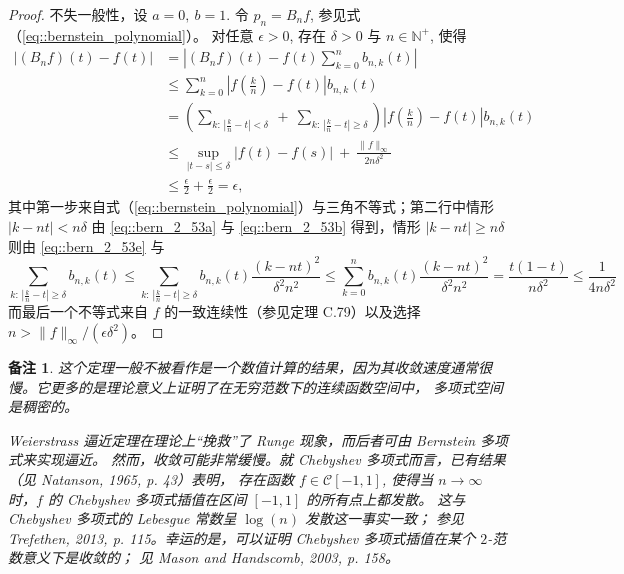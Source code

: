 \documentclass[a4paper]{ctexart}
\newtheorem{remark}{备注}
\numberwithin{theorem}{section}
\numberwithin{equation}{section}
\numberwithin{figure}{section}
\numberwithin{remark}{section}
\begin{document}
\begin{proof}
不失一般性，设 $a=0,\ b=1$. 令 $p_n=B_n f$, 参见式（\ref{eq::bernstein_polynomial}）。
对任意 $\epsilon>0$, 存在 $\delta>0$ 与 $n\in\mathbb{N}^+$, 使得
\begin{align*}
\bigl|(B_n f)(t)-f(t)\bigr|
&=\left|(B_n f)(t)-f(t)\sum_{k=0}^{n} b_{n,k}(t)\right| \nonumber\\
&\le \sum_{k=0}^{n}\left| f\!\left(\frac{k}{n}\right)-f(t)\right| b_{n,k}(t) \nonumber\\
&=\left(\sum_{k:\,\left|\frac{k}{n}-t\right|<\delta}\ +\ \sum_{k:\,\left|\frac{k}{n}-t\right|\ge \delta}\right)
\left| f\!\left(\frac{k}{n}\right)-f(t)\right| b_{n,k}(t) \nonumber\\
&\le \sup_{|t-s|\le \delta} |f(t)-f(s)|\ +\ \frac{\lVert f\rVert_\infty}{2n\delta^{2}} \nonumber\\
&\le \frac{\epsilon}{2}+\frac{\epsilon}{2}=\epsilon,
\end{align*}
其中第一步来自式（\ref{eq::bernstein_polynomial}）与三角不等式；第二行中情形 $|k-nt|<n\delta$ 由
\eqref{eq::bern_2_53a} 与 \eqref{eq::bern_2_53b} 得到，情形 $|k-nt|\ge n\delta$ 则由
\eqref{eq::bern_2_53e} 与
\begin{equation*}
\sum_{k:\, \left|\frac{k}{n}-t\right|\ge \delta} b_{n,k}(t)
\le \sum_{k:\, \left|\frac{k}{n}-t\right|\ge \delta} b_{n,k}(t)\frac{(k-nt)^2}{\delta^{2} n^{2}}
\le \sum_{k=0}^{n} b_{n,k}(t)\frac{(k-nt)^2}{\delta^{2} n^{2}}
= \frac{t(1-t)}{n\delta^{2}}\le \frac{1}{4n\delta^{2}}
\end{equation*}
而最后一个不等式来自 $f$ 的一致连续性（参见定理 C.79）以及选择 $n>\lVert f\rVert_\infty/(\epsilon\delta^{2})$。
\end{proof}

\begin{remark}
这个定理一般不被看作是一个数值计算的结果，因为其收敛速度通常很慢。它更多的是理论意义上证明了在无穷范数下的连续函数空间中，
多项式空间是稠密的。
    
Weierstrass 逼近定理在理论上“挽救”了 Runge 现象，而后者可由 Bernstein 多项式来实现逼近。
然而，收敛可能非常缓慢。就 Chebyshev 多项式而言，已有结果（见 Natanson, 1965, p. 43）表明，
存在函数 $f\in\mathcal{C}[-1,1]$, 使得当 $n\to\infty$ 时，$f$ 的 Chebyshev 多项式插值在区间 $[-1,1]$ 的所有点上都发散。
这与 Chebyshev 多项式的 Lebesgue 常数呈 $\log(n)$ 发散这一事实一致；
参见 Trefethen, 2013, p. 115。幸运的是，可以证明 Chebyshev 多项式插值在某个 $2$-范数意义下是收敛的；
见 Mason and Handscomb, 2003, p. 158。
\end{remark}
\end{document}
